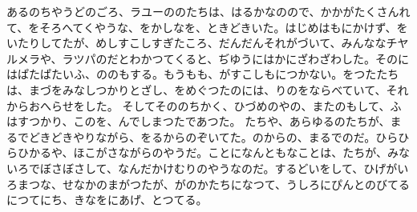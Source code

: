 \documentclass[a4paper,
tate,
book]
{jlreq}
\begin{document}
  あるのちやうどのごろ、ラユーののたちは、はるかなのので、かかがたくさんれて、をそろへてくやうな、をかしなを、ときどきいた。はじめはもにかけず、をいたりしてたが、めしすこしすぎたころ、だんだんそれがづいて、みんななチヤルメラや、ラツパのだとわかつてくると、ぢゆうにはかにざわざわした。そのにはぱたぱたいふ、ののもする。もうもも、がすこしもにつかない。をつたたちは、まづをみなしつかりとざし、をめぐつたのには、りのをならべていて、それからおへらせをした。
  そしてそののちかく、ひづめのやの、またのもして、ふはすつかり、このを、んでしまつたであつた。
  たちや、あらゆるのたちが、まるでどきどきやりながら、をるからのぞいてた。のからの、まるでのだ。ひらひらひかるや、ほこがさながらのやうだ。ことになんともなことは、たちが、みないろでぼさぼさして、なんだかけむりのやうなのだ。するどいをして、ひげがいろまつな、せなかのまがつたが、がのかたちになつて、うしろにぴんとのびてるにつてにち、きなをにあげ、とつてる。
 
\end{document}

